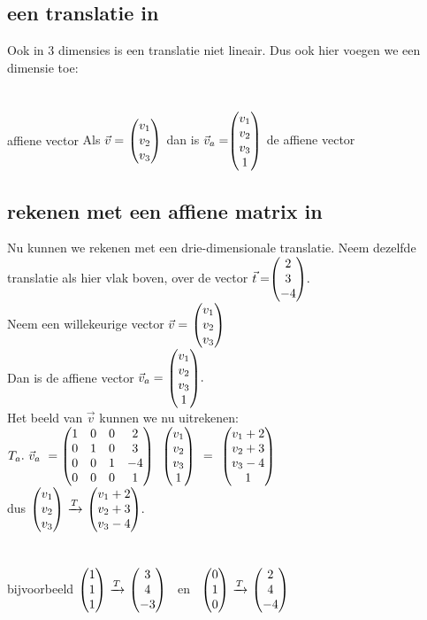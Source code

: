 \documentclass[hidelinks, a4wide, 12pt,  twoside]{book}
\begin{document}
\subsection{een translatie in \RD}
Ook in 3 dimensies is een translatie niet lineair. Dus ook hier voegen we een dimensie toe:
\\ \\
\\          
\mydef 
{affiene vector \RD}
{ Als $\vec{v} = \ \vecdriesnel{v} $ \quad dan is \quad 
	$\vec{v}_a = \vecvier{v_1} {v_2} {v_3} {1}  $ \quad de affiene vector }\\


\subsection{rekenen met een affiene  matrix in \RD}
Nu kunnen we rekenen met een drie-dimensionale translatie.
Neem dezelfde translatie als hier vlak boven, over de vector $ \vec{t}=  \vecdrie{2}{3}{-4}. $ \\
Neem een willekeurige  vector $\vec{v} = \ \vecdriesnel{v} $\\  Dan is de affiene vector  $\vec{v}_a = \  \vecvier{v_1} {v_2} {v_3} {1} . $\\ 
Het beeld van $\vec{v} $ kunnen we nu uitrekenen:
$ T_a  . \ \vec{v}_a \ 
=   \matvier{ 1 & 0 & 0 & 2} 
{ 0 & 1 & 0 &  3}  
{ 0 & 0 & 1 &  -4 } 
{0 & 0 &  0 & 1 } \ \  \vecvier{v_1} {v_2} {v_3} {1} \ \ 
= \ \  \vecvier{v_1 + 2} {v_2 + 3 } {v_3 - 4 } {1} $ \\
dus 
\quad \quad \quad $ \vecdriesnel{v}  \  \xrightarrow{T}   \   \vecdrie{v_1+2} {v_2+3} {v_3-4} . $ 
\\ \\ \\
bijvoorbeeld 
$ \vecdrie{1}{1}{1}  \  \xrightarrow{T}   \   \vecdrie{3} {4} {-3} $ \ \quad en \
\quad $ \vecdrie{0}{1}{0}  \  \xrightarrow{T}   \   \vecdrie{2} {4} {-4} $ 
\end{document}
